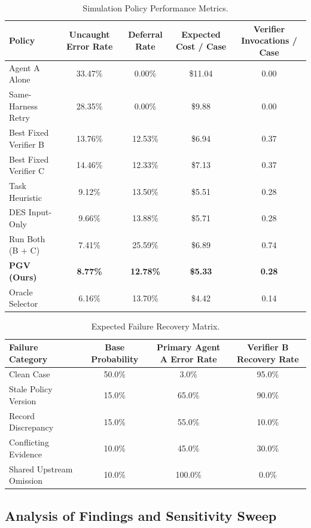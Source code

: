 \documentclass[manuscript,screen,nonacm]{acmart}
\newcommand{\PolicyAError}{65.0}
\newcommand{\PolicyBRecovery}{90.0}
\newcommand{\RecordAError}{55.0}
\newcommand{\RecordBRecovery}{10.0}
\newcommand{\OmissionAError}{100.0}
\newcommand{\OmissionBRecovery}{0.0}
\newcommand{\PgvErrorRate}{8.77}
\newcommand{\PgvCost}{5.33}
\newcommand{\FixedBErrorRate}{13.76}
\newcommand{\FixedBCost}{6.94}
\newcommand{\FixedCErrorRate}{14.46}
\newcommand{\FixedCCost}{7.13}
\newcommand{\HeuristicErrorRate}{9.12}
\newcommand{\HeuristicCost}{5.51}
\newcommand{\RunBothErrorRate}{7.41}
\newcommand{\RunBothCost}{6.89}
\newcommand{\DesErrorRate}{9.66}
\newcommand{\DesCost}{5.71}
\newcommand{\OracleErrorRate}{6.16}
\newcommand{\OracleCost}{4.42}
\begin{document}
\begin{table}[h]
\caption{Simulation Policy Performance Metrics.}
\label{tab:results_table}
\small
\centering
\begin{tabular}{lcccc}
\toprule
Policy & Uncaught Error Rate & Deferral Rate & Expected Cost / Case & Verifier Invocations / Case \\
\midrule
Agent A Alone & 33.47\% & 0.00\% & \$11.04 & 0.00 \\
Same-Harness Retry & 28.35\% & 0.00\% & \$9.88 & 0.00 \\
Best Fixed Verifier B & \FixedBErrorRate\% & 12.53\% & \$\FixedBCost & 0.37 \\
Best Fixed Verifier C & \FixedCErrorRate\% & 12.33\% & \$\FixedCCost & 0.37 \\
Task Heuristic & \HeuristicErrorRate\% & 13.50\% & \$\HeuristicCost & 0.28 \\
DES Input-Only & \DesErrorRate\% & 13.88\% & \$\DesCost & 0.28 \\
Run Both (B + C) & \RunBothErrorRate\% & 25.59\% & \$\RunBothCost & 0.74 \\
\textbf{PGV (Ours)} & \textbf{\PgvErrorRate\%} & \textbf{12.78\%} & \textbf{\$\PgvCost} & \textbf{0.28} \\
Oracle Selector & \OracleErrorRate\% & 13.70\% & \$\OracleCost & 0.14 \\
\bottomrule
\end{tabular}
\end{table}

\begin{table}[h]
\caption{Expected Failure Recovery Matrix.}
\label{tab:recovery_matrix}
\small
\centering
\begin{tabular}{lccc}
\toprule
Failure Category & Base Probability & Primary Agent A Error Rate & Verifier B Recovery Rate \\
\midrule
Clean Case & 50.0\% & 3.0\% & 95.0\% \\
Stale Policy Version & 15.0\% & \PolicyAError\% & \PolicyBRecovery\% \\
Record Discrepancy & 15.0\% & \RecordAError\% & \RecordBRecovery\% \\
Conflicting Evidence & 10.0\% & 45.0\% & 30.0\% \\
Shared Upstream Omission & 10.0\% & \OmissionAError\% & \OmissionBRecovery\% \\
\bottomrule
\end{tabular}
\end{table}

\subsection{Analysis of Findings and Sensitivity Sweep}
\end{document}

